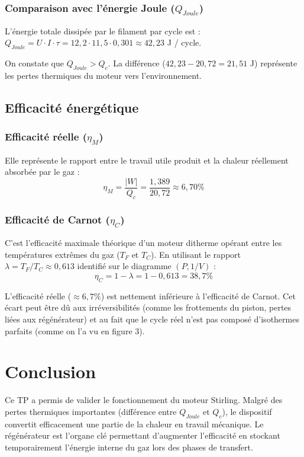 \documentclass[a4paper,9pt,french]{scrartcl}
\begin{document}
\subsubsection{Comparaison avec l'énergie Joule ($Q_{Joule}$)} 
L'énergie totale dissipée par le filament par cycle est :
$Q_{Joule} = U \cdot I \cdot \tau = 12,2 \cdot 11,5 \cdot 0,301 \approx {42,23}$ {J / cycle}.

On constate que $Q_{Joule} > Q_c$. La différence ($42,23 - 20,72 = 21,51$ J) représente les pertes thermiques du moteur vers l'environnement.

\subsection{Efficacité énergétique}

\subsubsection{Efficacité réelle ($\eta_M$)}
Elle représente le rapport entre le travail utile produit et la chaleur réellement absorbée par le gaz :
$$\eta_M = \frac{|W|}{Q_c} = \frac{1,389}{20,72} \approx {6,70\%}$$

\subsubsection{Efficacité de Carnot ($\eta_C$)}
C'est l'efficacité maximale théorique d'un moteur ditherme opérant entre les températures extrêmes du gaz ($T_F$ et $T_C$). En utilisant le rapport $\lambda = T_F / T_C \approx 0,613$ identifié sur le diagramme $(P, 1/V)$ :
$$\eta_C = 1 - \lambda = 1 - 0,613 = {38,7\%}$$



L'efficacité réelle ($\approx 6,7\%$) est nettement inférieure à l'efficacité de Carnot. Cet écart peut être dû aux irréversibilités (comme les frottements du piston, pertes liées aux régénérateur) et au fait que le cycle réel n'est pas composé d'isothermes parfaits (comme on l'a vu en figure 3). 
\section{Conclusion}
Ce TP a permis de valider le fonctionnement du moteur Stirling. Malgré des pertes thermiques importantes (différence entre $Q_{Joule}$ et $Q_c$), le dispositif convertit efficacement une partie de la chaleur en travail mécanique. Le régénérateur est l'organe clé permettant d'augmenter l'efficacité en stockant temporairement l'énergie interne du gaz lors des phases de transfert.
\end{document}
